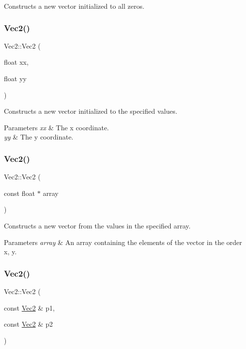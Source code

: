 Constructs a new vector initialized to all zeros. \mbox{\label{classVec2_a8e4727da05d8400e3c7153b76974214c}} 
\subsubsection{\texorpdfstring{Vec2()}{Vec2()}\hspace{0.1cm}{\footnotesize\ttfamily [7/9]}}
{\footnotesize\ttfamily Vec2\+::\+Vec2 (\begin{DoxyParamCaption}\item[{float}]{xx,  }\item[{float}]{yy }\end{DoxyParamCaption})}

Constructs a new vector initialized to the specified values.


\begin{DoxyParams}{Parameters}
{\em xx} & The x coordinate. \\
\hline
{\em yy} & The y coordinate. \\
\hline
\end{DoxyParams}
\mbox{\label{classVec2_a469928d68a31daa0f3cd858e8b68701d}} 
\subsubsection{\texorpdfstring{Vec2()}{Vec2()}\hspace{0.1cm}{\footnotesize\ttfamily [8/9]}}
{\footnotesize\ttfamily Vec2\+::\+Vec2 (\begin{DoxyParamCaption}\item[{const float $\ast$}]{array }\end{DoxyParamCaption})}

Constructs a new vector from the values in the specified array.


\begin{DoxyParams}{Parameters}
{\em array} & An array containing the elements of the vector in the order x, y. \\
\hline
\end{DoxyParams}
\mbox{\label{classVec2_aff34a0a8b960dcfbcc5ac1d8d3af3493}} 
\subsubsection{\texorpdfstring{Vec2()}{Vec2()}\hspace{0.1cm}{\footnotesize\ttfamily [9/9]}}
{\footnotesize\ttfamily Vec2\+::\+Vec2 (\begin{DoxyParamCaption}\item[{const \hyperlink{classVec2}{Vec2} \&}]{p1,  }\item[{const \hyperlink{classVec2}{Vec2} \&}]{p2 }\end{DoxyParamCaption})}

